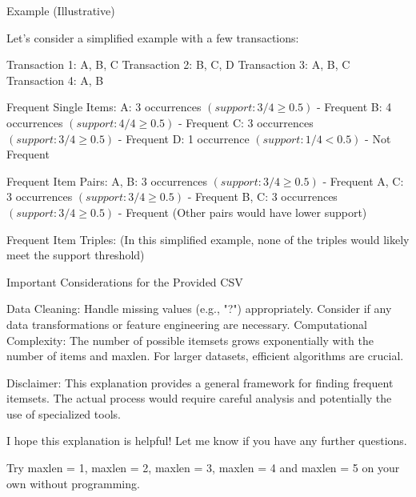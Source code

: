\documentclass[12pt]{article}
\begin{document}
\begin{mdframed}
Example (Illustrative)
\newline

Let's consider a simplified example with a few transactions:
\newline

    Transaction 1: {A, B, C}
    Transaction 2: {B, C, D}
    Transaction 3: {A, B, C}
    Transaction 4: {A, B}
\newline

    Frequent Single Items:
        A: 3 occurrences $(support: 3/4 \geq 0.5)$ - Frequent
        B: 4 occurrences $(support: 4/4 \geq 0.5)$ - Frequent
        C: 3 occurrences $(support: 3/4 \geq 0.5)$ - Frequent
        D: 1 occurrence $(support: 1/4 < 0.5)$ - Not Frequent
\newline

    Frequent Item Pairs:
        {A, B}: 3 occurrences $(support: 3/4 \geq 0.5)$ - Frequent
        {A, C}: 3 occurrences $(support: 3/4 \geq 0.5)$ - Frequent
        {B, C}: 3 occurrences $(support: 3/4 \geq 0.5)$ - Frequent
        (Other pairs would have lower support)
\newline

    Frequent Item Triples: (In this simplified example, none of the triples would likely meet the support threshold)
\newline

Important Considerations for the Provided CSV
\newline

    Data Cleaning:
        Handle missing values (e.g., "?") appropriately.
        Consider if any data transformations or feature engineering are necessary.
    Computational Complexity:
        The number of possible itemsets grows exponentially with the number of items and maxlen.
        For larger datasets, efficient algorithms are crucial.
\newline

Disclaimer: This explanation provides a general framework for finding frequent itemsets. The actual process would require careful analysis and potentially the use of specialized tools.
\newline

I hope this explanation is helpful! Let me know if you have any further questions.
\end{mdframed}

Try maxlen = 1, maxlen = 2, maxlen = 3, maxlen = 4 and maxlen = 5 on your own without programming.
\end{document}
